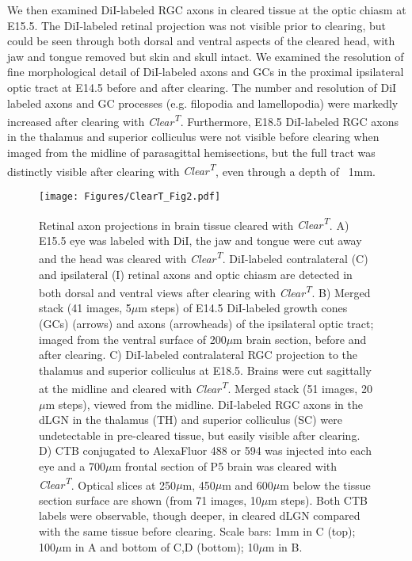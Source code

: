 We then examined DiI-labeled RGC axons in cleared tissue at the optic chiasm at E15.5. %
The DiI-labeled retinal projection was not visible prior to clearing, but could be seen through both dorsal and ventral aspects of the cleared head, with jaw and tongue removed but skin and skull intact. %
We examined the resolution of fine morphological detail of DiI-labeled axons and GCs in the proximal ipsilateral optic tract at E14.5 before and after clearing. %
The number and resolution of DiI labeled axons and GC processes (e.g. filopodia and lamellopodia) were markedly increased after clearing with \emph{Clear\textsuperscript{T}}.%
Furthermore, E18.5 DiI-labeled RGC axons in the thalamus and superior colliculus were not visible before clearing when imaged from the midline of parasagittal hemisections, but the full tract was distinctly visible after clearing with \emph{Clear\textsuperscript{T}}, even through a depth of ~1mm. %
\begin{figure}[hbtp]
    \begin{center}
        \texttt{[image: Figures/ClearT\_Fig2.pdf]}
        \caption[Retinal axon projections in brain tissue cleared with \emph{Clear\textsuperscript{T}}.]
        {Retinal axon projections in brain tissue cleared with \emph{Clear\textsuperscript{T}}.
        A) E15.5 eye was labeled with DiI, the jaw and tongue were cut away and the head was cleared with \emph{Clear\textsuperscript{T}}.
        DiI-labeled contralateral (C) and ipsilateral (I) retinal axons and optic chiasm are detected in both dorsal and ventral views after clearing with \emph{Clear\textsuperscript{T}}.
        B) Merged stack (41 images, 5$\mu$m steps) of E14.5 DiI-labeled growth cones (GCs) (arrows) and axons (arrowheads) of the ipsilateral optic tract; imaged from the ventral surface of 200$\mu$m brain section, before and after clearing.
        C) DiI-labeled contralateral RGC projection to the thalamus and superior colliculus at E18.5.
        Brains were cut sagittally at the midline and cleared with \emph{Clear\textsuperscript{T}}.
        Merged stack (51 images, 20$\mu$m steps), viewed from the midline.
        DiI-labeled RGC axons in the dLGN in the thalamus (TH) and superior colliculus (SC) were undetectable in pre-cleared tissue, but easily visible after clearing.
        D) CTB conjugated to AlexaFluor 488 or 594 was injected into each eye and a 700$\mu$m frontal section of P5 brain was cleared with \emph{Clear\textsuperscript{T}}.
        Optical slices at 250$\mu$m, 450$\mu$m and 600$\mu$m below the tissue section surface are shown (from 71 images, 10$\mu$m steps).
        Both CTB labels were observable, though deeper, in cleared dLGN compared with the same tissue before clearing.
        Scale bars: 1mm in C (top); 100$\mu$m in A and bottom of C,D (bottom); 10$\mu$m in B.
        }
        \label{ClearT\_Fig2}
    \end{center}
\end{figure}

